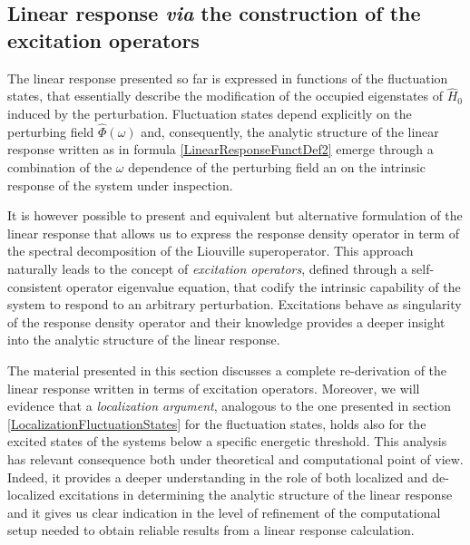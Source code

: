 \documentclass[a4paper]{article}
\newcommand{\op}[1]{\hat {#1}}
\newcommand{\hnot}{\op{H}_0}
\begin{document}
\subsection{Linear response \emph{via} the construction of the excitation operators}

The linear response presented so far is expressed in functions of the fluctuation states, that essentially describe the modification of the occupied eigenstates of $\hnot$ induced by 
the perturbation. Fluctuation states depend explicitly on the perturbing field $\op\Phi(\omega)$ and, consequently, the analytic structure of the linear response written as in formula 
\eqref{LinearResponseFunctDef2} emerge through a combination of the $\omega$ dependence of the perturbing field an on the intrinsic response of the system under inspection.    

It is however possible to present and equivalent but alternative formulation of the linear response that allows us to express the response density operator in term of the spectral
decomposition of the Liouville superoperator. This approach naturally leads to the concept of \emph{excitation operators}, defined through a self-consistent operator eigenvalue equation,
that codify the intrinsic capability of the system to respond to an arbitrary perturbation. Excitations behave as singularity of the response density operator and their knowledge provides a 
deeper insight into the analytic structure of the linear response. 

The material presented in this section discusses a complete re-derivation of the linear response written in terms of excitation operators. Moreover, we will evidence that a \emph{localization 
argument}, analogous to the one presented in section \ref{LocalizationFluctuationStates} for the fluctuation states, holds also for the excited states of the systems below a specific energetic
threshold. This analysis has relevant consequence both under theoretical and computational point of view. Indeed, it provides a deeper understanding in the role of both localized and de-localized 
excitations in determining the analytic structure of the linear response and it gives us clear indication in the level of refinement of the computational setup needed to obtain reliable results 
from a linear response calculation. 
\end{document}
